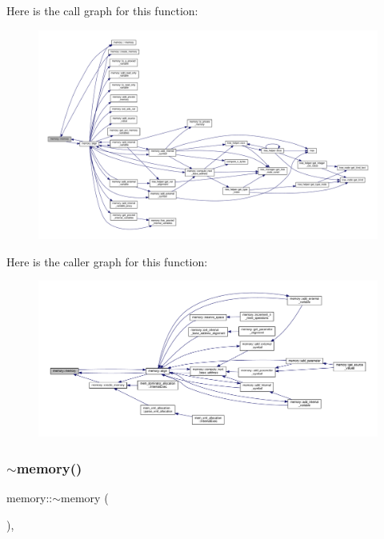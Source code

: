 Here is the call graph for this function\+:
\nopagebreak
\begin{figure}[H]
\begin{center}
\leavevmode
\includegraphics[width=350pt]{d8/d99/classmemory_a4944f160b2ac6d7b7c212beeb606bd7f_cgraph}
\end{center}
\end{figure}
Here is the caller graph for this function\+:
\nopagebreak
\begin{figure}[H]
\begin{center}
\leavevmode
\includegraphics[width=350pt]{d8/d99/classmemory_a4944f160b2ac6d7b7c212beeb606bd7f_icgraph}
\end{center}
\end{figure}
\mbox{\label{classmemory_ae5893b724ce22f38b776558384f21680}} 
\subsubsection{\texorpdfstring{$\sim$memory()}{~memory()}}
{\footnotesize\ttfamily memory\+::$\sim$memory (\begin{DoxyParamCaption}{ }\end{DoxyParamCaption})\hspace{0.3cm}{\ttfamily [virtual]}, {\ttfamily [default]}}



